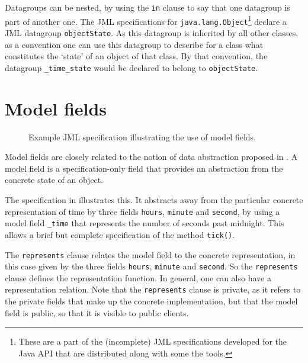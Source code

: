 \documentclass{llncs}
\begin{document}
Datagroups can be nested, by using the \texttt{in} clause to say that
one datagroup is part of another one. The JML specifications for
\texttt{java.lang.Object}\footnote{These are a part of the (incomplete) JML 
specifications developed for the Java API that are distributed along with 
some the tools.} declare a JML datagroup \texttt{objectState}. As this datagroup
is inherited by all other classes, as a convention one can use this datagroup 
to describe for a class what constitutes the `state' of an object of that class.
By that convention, the datagroup \texttt{\_time\_state} would be declared
to belong to \texttt{objectState}.

\section{Model fields}
\label{Sec:model}


\begin{figure}[tbp] 
%

%
\vspace*{-2ex} %
\caption{\label{Example:model}Example JML specification illustrating the use of model fields.}
\end{figure}


Model fields are closely related to the notion of data abstraction proposed in 
\cite{Hoare72}.  A model field is a specification-only field that provides an 
abstraction from the concrete state of an object.  

The specification in  illustrates this.
It abstracts away from the particular concrete representation of time
by three fields \texttt{hours}, \texttt{minute} and \texttt{second},
by using a model field \texttt{\_time} that represents the number of seconds
past midnight.
This allows a brief but complete specification of the method \texttt{tick()}.

The \texttt{represents} clause relates the model field to the concrete representation,
in this case given by the three fields  \texttt{hours}, \texttt{minute} and 
\texttt{second}. So the \texttt{represents} clause defines the 
representation function. In general, one can also have a representation relation.
Note that the \texttt{represents} clause is private, as it refers to the private
fields that make up the concrete implementation, but that the model field
is public, so that it is visible to public clients.
\end{document}
